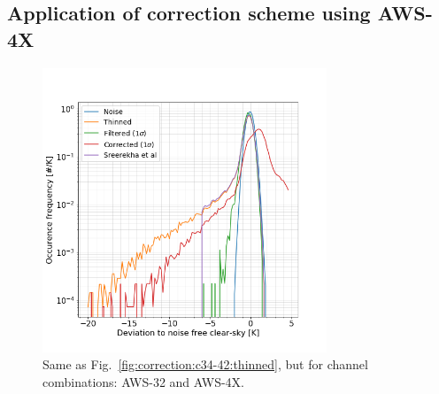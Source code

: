 \documentclass[12pt]{article}
\begin{document}
\subsection{Application of correction scheme using AWS-4X}
%
\begin{figure}[!t]
	\centering
	\includegraphics[height=85mm]{PDF_corrected_AWS-32_AWS-4X_thinned}
	\caption{Same as Fig.~\ref{fig:correction:c34-42:thinned}, but for channel combinations: AWS-32 and AWS-4X.}
	\label{fig:correction:c32-4X:thinned}
\end{figure}
%
\end{document}
